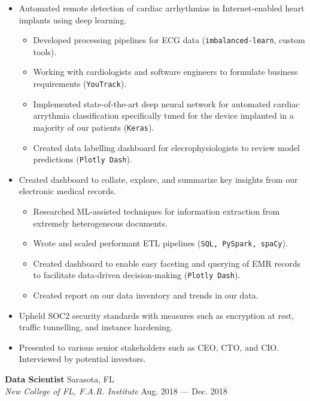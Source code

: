 \documentclass[a4paper,12pt]{article}
\newcommand{\ressubheading}[4]{{\begin{minipage}{\textwidth}
                                    \textbf{#1} \hfill #2 \\
                                    \textit{#3} \hfill #4 \\
\end{minipage}}}
\begin{document}
    \begin{itemize}

        \item  Automated remote detection of cardiac arrhythmias in Internet-enabled heart implants using deep learning.
        \begin{itemize}
            \item Developed processing pipelines for ECG data (\texttt{imbalanced-learn}, custom tools).
            \item Working with cardiologists and software engineers to formulate business requirements (\texttt{YouTrack}).
            \item Implemented state-of-the-art deep neural network for automated cardiac arrythmia classification specifically tuned for the device implanted in a majority of our patients (\texttt{Keras}).
            \item Created data labelling dashboard for elecrophysiologists to review model predictions (\texttt{Plotly Dash}).
        \end{itemize}

        \item Created dashboard to collate, explore, and summarize key insights from our electronic medical records.
        \begin{itemize}
            \item Researched ML-assisted techniques for information extraction from extremely heterogeneous documents.
            \item Wrote and scaled performant ETL pipelines (\texttt{SQL, PySpark, spaCy}).
            \item Created dashboard to enable easy faceting and querying of EMR records to facilitate data-driven decision-making (\texttt{Plotly Dash}).
            \item Created report on our data inventory and trends in our data.
        \end{itemize}


        \item Upheld SOC2 security standards with measures such as encryption at rest, traffic tunnelling, and instance hardening.
        \item Presented to various senior stakeholders such as CEO, CTO, and CIO. Interviewed by potential investors.

    \end{itemize}


    \ressubheading{Data Scientist}{Sarasota, FL}{New College of FL, F.A.R. Institute}{Aug. 2018 --- Dec. 2018}
\end{document}

